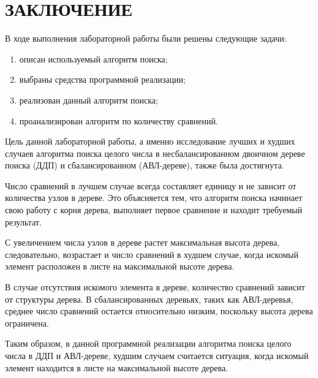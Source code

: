 \chapter*{ЗАКЛЮЧЕНИЕ}

В ходе выполнения лабораторной работы были решены следующие задачи:

\begin{enumerate}[label={\arabic*)}]
	\item описан используемый алгоритм поиска;
	\item выбраны средства программной реализации;
	\item реализован данный алгоритм поиска;
	\item проанализирован алгоритм по количеству сравнений.
\end{enumerate}

Цель данной лабораторной работы, а именно исследование лучших и худших случаев алгоритма поиска целого числа в несбалансированном двоичном дереве поиска (ДДП) и сбалансированном (АВЛ-дереве), также была достигнута.

Число сравнений в лучшем случае всегда составляет единицу и не зависит от количества узлов в дереве. 
Это объясняется тем, что алгоритм поиска начинает свою работу с корня дерева, выполняет первое сравнение и находит требуемый результат.

С увеличением числа узлов в дереве растет максимальная высота дерева, следовательно, возрастает и число сравнений в худшем случае, когда искомый элемент расположен в листе на максимальной высоте дерева.

В случае отсутствия искомого элемента в дереве, количество сравнений зависит от структуры дерева. В сбалансированных деревьях, таких как АВЛ-деревья, среднее число сравнений остается относительно низким, поскольку высота дерева ограничена.

Таким образом, в данной программной реализации алгоритма поиска целого числа в ДДП и АВЛ-дереве, худшим случаем считается ситуация, когда искомый элемент находится в листе на максимальной высоте дерева.
